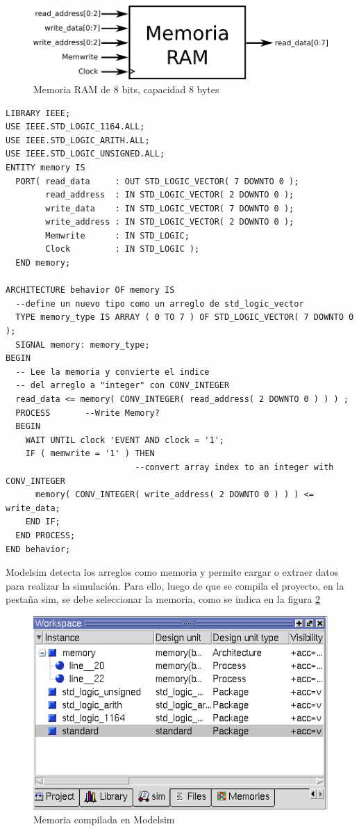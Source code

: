 \begin{figure}[h]
  \centering
    \includegraphics[width=.7\textwidth]{graficos/ram.png}
  \caption{Memoria RAM de 8 bits, capacidad 8 bytes}
  \label{ram}
\end{figure}
\begin{lstlisting}[style=vhdl, basicstyle=\footnotesize\ttfamily]
LIBRARY IEEE;
USE IEEE.STD_LOGIC_1164.ALL;
USE IEEE.STD_LOGIC_ARITH.ALL;
USE IEEE.STD_LOGIC_UNSIGNED.ALL;
ENTITY memory IS
  PORT( read_data     : OUT STD_LOGIC_VECTOR( 7 DOWNTO 0 );
        read_address  : IN STD_LOGIC_VECTOR( 2 DOWNTO 0 );
        write_data    : IN STD_LOGIC_VECTOR( 7 DOWNTO 0 ); 
        write_address : IN STD_LOGIC_VECTOR( 2 DOWNTO 0 );
        Memwrite      : IN STD_LOGIC;
        Clock         : IN STD_LOGIC );
  END memory;

ARCHITECTURE behavior OF memory IS
  --define un nuevo tipo como un arreglo de std_logic_vector
  TYPE memory_type IS ARRAY ( 0 TO 7 ) OF STD_LOGIC_VECTOR( 7 DOWNTO 0 );
  SIGNAL memory: memory_type;
BEGIN
  -- Lee la memoria y convierte el indice 
  -- del arreglo a "integer" con CONV_INTEGER
  read_data <= memory( CONV_INTEGER( read_address( 2 DOWNTO 0 ) ) ) ;
  PROCESS       --Write Memory?
  BEGIN
    WAIT UNTIL clock 'EVENT AND clock = '1';
    IF ( memwrite = '1' ) THEN
                          --convert array index to an integer with CONV_INTEGER
      memory( CONV_INTEGER( write_address( 2 DOWNTO 0 ) ) ) <= write_data;
    END IF;
  END PROCESS;
END behavior; 
\end{lstlisting}

Modelsim detecta los arreglos como memoria y permite cargar o extraer datos
para realizar la simulación. Para ello, luego de que se compila el proyecto,
en la pestaña sim, se debe seleccionar la memoria, como se indica en la figura \ref{msmemsim}

\begin{figure}[h]
  \centering
    \includegraphics[width=.7\textwidth]{graficos/ms_mem1.png}
  \caption{Memoria compilada en Modelsim}
  \label{msmemsim}
\end{figure}

